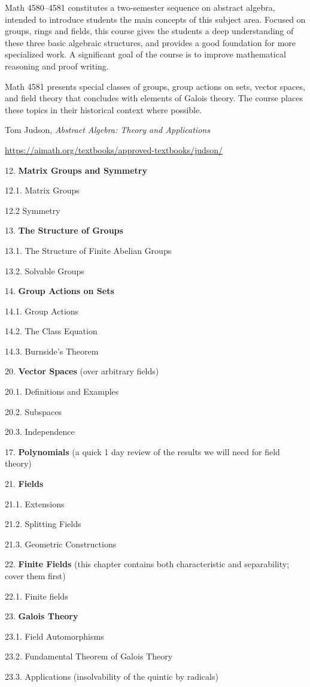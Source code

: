 \documentclass{osucourse}
\begin{document}
\CatalogDescription
\PrerequisitesAndExclusions

\begin{Purpose}
Math 4580--4581 constitutes a two-semester sequence on abstract algebra,
intended to introduce students the main concepts of this subject area.
Focused on groups, rings and fields, this course gives the students a
deep understanding of these three basic algebraic structures, and
provides a good foundation for more specialized work. A significant goal
of the course is to improve mathematical reasoning and proof writing.

Math 4581 presents special classes of groups, group actions on sets,
vector spaces, and field theory that concludes with elements of Galois
theory. The course places these topics in their historical context where
possible.
\end{Purpose}

\begin{Text}
Tom Judson, \emph{Abstract Algebra: Theory and Applications}

\url{https://aimath.org/textbooks/approved-textbooks/judson/}
\end{Text}

\begin{TopicsOutline}
12. \textbf{Matrix Groups and Symmetry}

12.1. Matrix Groups

12.2 Symmetry

13. \textbf{The Structure of Groups}

13.1. The Structure of Finite Abelian Groups

13.2. Solvable Groups

14. \textbf{Group Actions on Sets}

14.1. Group Actions

14.2. The Class Equation

14.3. Burnside's Theorem

20. \textbf{Vector Spaces} (over arbitrary fields)

20.1. Definitions and Examples

20.2. Subspaces

20.3. Independence

17. \textbf{Polynomials} (a quick 1 day review of the results we will
need for field theory)

21. \textbf{Fields}

21.1. Extensions

21.2. Splitting Fields

21.3. Geometric Constructions

22. \textbf{Finite Fields} (this chapter contains both characteristic
and separability; cover them first)

22.1. Finite fields

23. \textbf{Galois Theory}

23.1. Field Automorphisms

23.2. Fundamental Theorem of Galois Theory

23.3. Applications (insolvability of the quintic by radicals)
\end{TopicsOutline}
\end{document}
